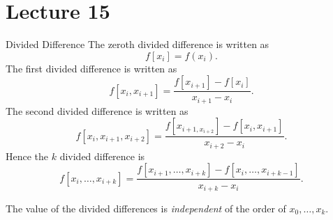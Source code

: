 \documentclass[class=article, crop=false]{standalone}
\begin{document}
  \section{Lecture 15}
  \begin{definition}{Divided Difference}
    The zeroth divided difference is written as
    \[
      f[x_i] = f(x_i).
    \]
    The first divided difference is written as
    \[
      f[x_i, x_{i + 1}] = \frac{f[x_{i + 1}] - f[x_i]}{x_{i + 1} - x_i}.
    \]
    The second divided difference is written as
    \[
      f[x_i, x_{i + 1}, x_{i + 2}] = \frac{f[x_{i + 1, x_{i + 2}}] - f[x_i, x_{i + 1}]}{x_{i + 2} - x_i}.
    \]
    Hence the $k$ divided difference is
    \[
      f[x_i,\dotsc,x_{i + k}] = \frac{f[x_{i + 1},\dotsc,x_{i + k}] - f[x_i,\dotsc,x_{i + k - 1}]}{x_{i + k} - x_i}.
    \]
  \end{definition}
  \begin{note}{}
    The value of the divided differences is \emph{independent} of the order of $x_0,\dotsc,x_k$.
  \end{note}
\end{document}
